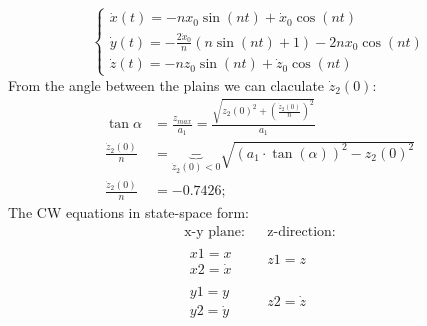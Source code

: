 \documentclass[11pt, a4paper]{article}
\begin{document}
\begin{equation}
    \left\{\begin{array}{l}
        \displaystyle\dot{x}(t) = -nx_0\sin(nt) + \dot{x}_0\cos(nt) \\
        \displaystyle\dot{y}(t) = -\frac{2\dot{x}_0}{n}\left(n\sin(nt)+1\right)-2nx_0\cos(nt) \\
        \dot{z}(t) = -nz_0\sin(nt) + \dot{z}_0\cos(nt)
    \end{array}\right.
\end{equation}
From the angle between the plains we can claculate $\dot{z}_2(0)$:
\begin{align}
    \tan\alpha &= \frac{z_{max}}{a_1} = \frac{\displaystyle\sqrt{z_2(0)^2+\left(\frac{\dot{z}_2(0)}{n}\right)^2}}{a_1} \\
    \frac{\dot{z}_2(0)}{n} &= \underbrace{-}_{\displaystyle\dot{z}_2(0)<0}\sqrt{\left(a_1\cdot\tan(\alpha)\right)^2-z_2(0)^2} \\
    \frac{\dot{z}_2(0)}{n} &= -0.7426;
\end{align}
The CW equations in state-space form:
\begin{equation}
    \begin{matrix}
        \text{x-y plane:} && \text{z-direction:} \\
        \begin{matrix}
            x1 = x \\
            x2 = \dot{x}
        \end{matrix} && z1 = z \\
        \begin{matrix}
            y1 = y \\
            y2 = \dot{y}
        \end{matrix} && z2 = \dot{z}
    \end{matrix}
\end{equation}
\end{document}

